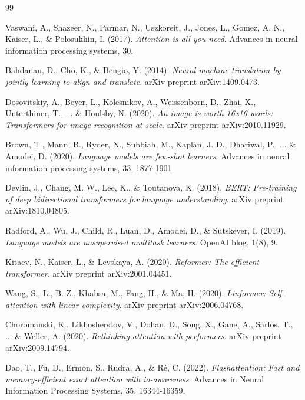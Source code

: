 \documentclass[11pt]{article}
\begin{document}

\begin{thebibliography}{99}

Vaswani, A., Shazeer, N., Parmar, N., Uszkoreit, J., Jones, L., Gomez, A. N., Kaiser, L., \& Polosukhin, I. (2017).
\textit{Attention is all you need}.
Advances in neural information processing systems, 30.

Bahdanau, D., Cho, K., \& Bengio, Y. (2014).
\textit{Neural machine translation by jointly learning to align and translate}.
arXiv preprint arXiv:1409.0473.

Dosovitskiy, A., Beyer, L., Kolesnikov, A., Weissenborn, D., Zhai, X., Unterthiner, T., ... \& Houlsby, N. (2020).
\textit{An image is worth 16x16 words: Transformers for image recognition at scale}.
arXiv preprint arXiv:2010.11929.

Brown, T., Mann, B., Ryder, N., Subbiah, M., Kaplan, J. D., Dhariwal, P., ... \& Amodei, D. (2020).
\textit{Language models are few-shot learners}.
Advances in neural information processing systems, 33, 1877-1901.

Devlin, J., Chang, M. W., Lee, K., \& Toutanova, K. (2018).
\textit{BERT: Pre-training of deep bidirectional transformers for language understanding}.
arXiv preprint arXiv:1810.04805.

Radford, A., Wu, J., Child, R., Luan, D., Amodei, D., \& Sutskever, I. (2019).
\textit{Language models are unsupervised multitask learners}.
OpenAI blog, 1(8), 9.

Kitaev, N., Kaiser, Ł., \& Levskaya, A. (2020).
\textit{Reformer: The efficient transformer}.
arXiv preprint arXiv:2001.04451.

Wang, S., Li, B. Z., Khabsa, M., Fang, H., \& Ma, H. (2020).
\textit{Linformer: Self-attention with linear complexity}.
arXiv preprint arXiv:2006.04768.

Choromanski, K., Likhosherstov, V., Dohan, D., Song, X., Gane, A., Sarlos, T., ... \& Weller, A. (2020).
\textit{Rethinking attention with performers}.
arXiv preprint arXiv:2009.14794.

Dao, T., Fu, D., Ermon, S., Rudra, A., \& Ré, C. (2022).
\textit{Flashattention: Fast and memory-efficient exact attention with io-awareness}.
Advances in Neural Information Processing Systems, 35, 16344-16359.

\end{thebibliography}
\end{document}

